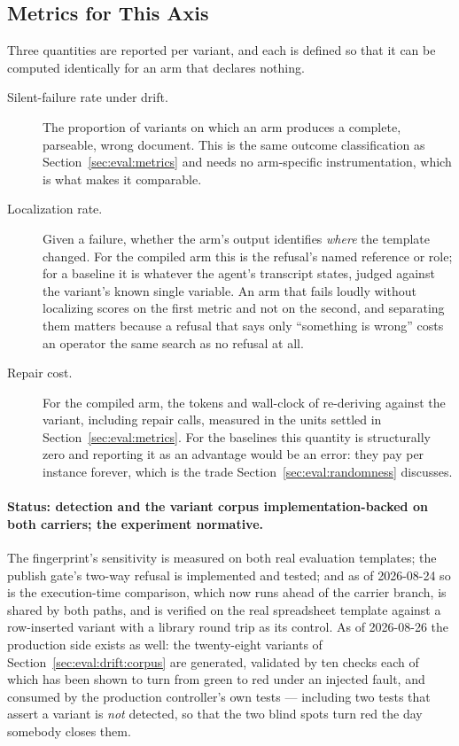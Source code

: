\subsection{Metrics for This Axis}

Three quantities are reported per variant, and each is defined so that it can be computed
identically for an arm that declares nothing.

\begin{description}
  \item[Silent-failure rate under drift.] The proportion of variants on which an arm produces
    a complete, parseable, wrong document. This is the same outcome classification as
    Section~\ref{sec:eval:metrics} and needs no arm-specific instrumentation, which is what
    makes it comparable.
  \item[Localization rate.] Given a failure, whether the arm's output identifies \emph{where}
    the template changed. For the compiled arm this is the refusal's named reference or role;
    for a baseline it is whatever the agent's transcript states, judged against the variant's
    known single variable. An arm that fails loudly without localizing scores on the first
    metric and not on the second, and separating them matters because a refusal that says only
    ``something is wrong'' costs an operator the same search as no refusal at all.
  \item[Repair cost.] For the compiled arm, the tokens and wall-clock of re-deriving against
    the variant, including repair calls, measured in the units settled in
    Section~\ref{sec:eval:metrics}. For the baselines this quantity is structurally zero and
    reporting it as an advantage would be an error: they pay per instance forever, which is
    the trade Section~\ref{sec:eval:randomness} discusses.
\end{description}

\paragraph{Status: detection and the variant corpus implementation-backed on both carriers;
the experiment normative.}
The fingerprint's sensitivity is measured on both real evaluation templates; the publish
gate's two-way refusal is implemented and tested; and as of 2026-08-24 so is the
execution-time comparison, which now runs ahead of the carrier branch, is shared by both
paths, and is verified on the real spreadsheet template against a row-inserted variant with a
library round trip as its control. As of 2026-08-26 the production side exists as well: the
twenty-eight variants of Section~\ref{sec:eval:drift:corpus} are generated, validated by ten
checks each of which has been shown to turn from green to red under an injected fault, and
consumed by the production controller's own tests --- including two tests that assert a variant
is \emph{not} detected, so that the two blind spots turn red the day somebody closes them.

